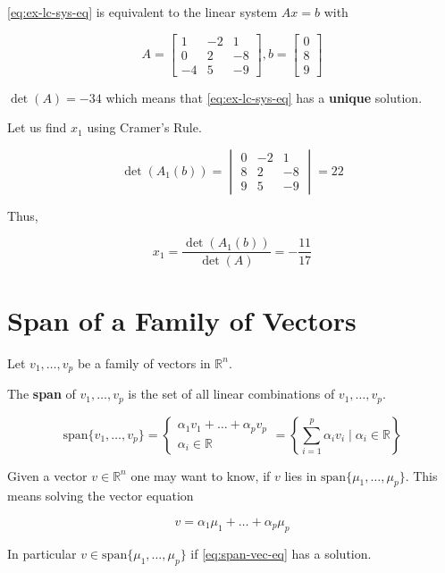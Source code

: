 \begin{sol}
	\cref*{eq:ex-lc-sys-eq} is equivalent to the linear system $Ax=b$ with

	\[A = \begin{bmatrix}
		1&-2&1\\0&2&-8\\-4&5&-9
	\end{bmatrix}, b=\begin{bmatrix}
		0\\8\\9
	\end{bmatrix}\]

	$\det(A) = -34$ which means that \cref*{eq:ex-lc-sys-eq} has a \textbf{unique} solution.

	Let us find $x_1$ using Cramer's Rule.

	\begin{equation} \label{eq:replace-matrix-det}
		\det(A_1(b)) = \begin{vmatrix}
			0&-2&1\\8&2&-8\\9&5&-9
		\end{vmatrix} = 22
	\end{equation}

	Thus,

	\begin{equation} \label{eq:x_1-sol}
		x_1 = \frac{\det(A_1(b))}{\det(A)} = -\frac{11}{17}
	\end{equation}
\end{sol}

\section{Span of a Family of Vectors}

\begin{definition}
	Let $v_1, \ldots, v_p$ be a family of vectors in $\mathbb{R}^n$.

	The \textbf{span} of $v_1, \ldots, v_p$ is the set of all linear combinations of $v_1, \ldots, v_p$.

	\begin{equation} \label{eq:span}
		\mathrm{span}\{v_1, \ldots, v_p\} =
		\begin{cases}
			\alpha_1v_1 + \ldots + \alpha_pv_p\\
			\alpha_i \in \mathbb{R}
		\end{cases} = \left\{\sum_{i=1}^{p} \alpha_i v_i \mid \alpha_i \in 
		\mathbb{R}\right\}
	\end{equation}

	Given a vector $v \in \mathbb{R}^n$ one may want to know, if $v$ lies in $\mathrm{span}\{\mu_1, \ldots, \mu_p\}$. This means solving the vector equation

	\begin{equation} \label{eq:span-vec-eq}
		v = \alpha_1\mu_1 + \ldots + \alpha_p\mu_p
	\end{equation}

	In particular $v \in \mathrm{span}\{\mu_1, \ldots, \mu_p\}$ if \cref*{eq:span-vec-eq} has a solution.
\end{definition}

